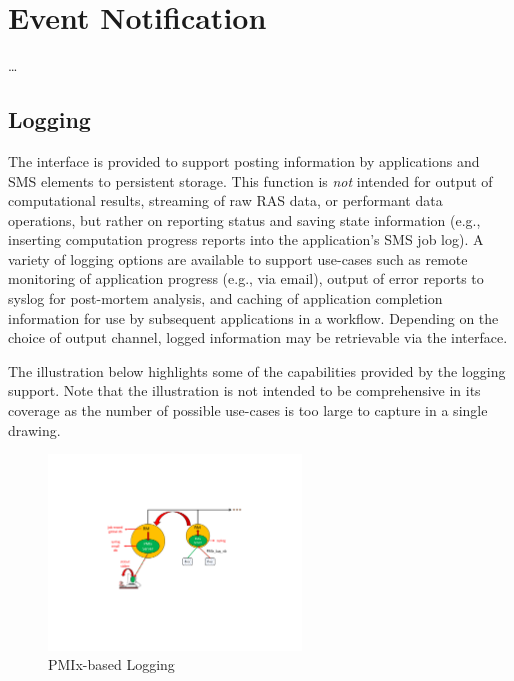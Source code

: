 \chapter{Event Notification}
\label{chap:api_event}

\ldots


\section{Logging}
\label{chap:api_event:logging}

\par
The  interface is provided to support posting information by applications and \ac{SMS} elements to persistent storage. This function is \emph{not} intended for output of computational results, streaming of raw \ac{RAS} data, or performant data operations, but rather on reporting status and saving state information (e.g., inserting computation progress reports into the application's \ac{SMS} job log). A variety of logging options are available to support use-cases such as remote monitoring of application progress (e.g., via email), output of error reports to syslog for post-mortem analysis, and caching of application completion information for use by subsequent applications in a workflow. Depending on the choice of output channel, logged information may be retrievable via the  interface.

\par
The illustration below highlights some of the capabilities provided by the logging support. Note that the illustration is not intended to be comprehensive in its coverage as the number of possible use-cases is too large to capture in a single drawing.

\begin{figure}[ht!]
\begin{center}
  \includegraphics[clip,width=0.6\textwidth]{figs/logging.pdf}
\end{center}
  \caption{PMIx-based Logging}
  \label{fig:logging}
\end{figure}



